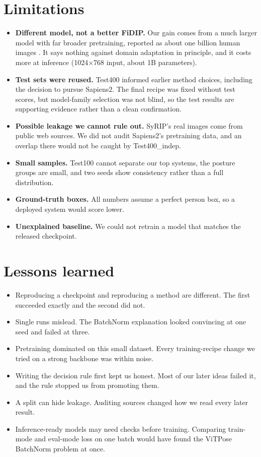 \documentclass[11pt]{article}
\begin{document}
\section{Limitations}
\begin{itemize}
  \item \textbf{Different model, not a better FiDIP.} Our gain comes from a much larger model with far broader pretraining, reported as about one billion human images \cite{sapiens2docs}. It says nothing against domain adaptation in principle, and it costs more at inference (1024$\times$768 input, about 1B parameters).
  \item \textbf{Test sets were reused.} Test400 informed earlier method choices, including the decision to pursue Sapiens2. The final recipe was fixed without test scores, but model-family selection was not blind, so the test results are supporting evidence rather than a clean confirmation.
  \item \textbf{Possible leakage we cannot rule out.} SyRIP's real images come from public web sources. We did not audit Sapiens2's pretraining data, and an overlap there would not be caught by Test400\_indep.
  \item \textbf{Small samples.} Test100 cannot separate our top systems, the posture groups are small, and two seeds show consistency rather than a full distribution.
  \item \textbf{Ground-truth boxes.} All numbers assume a perfect person box, so a deployed system would score lower.
  \item \textbf{Unexplained baseline.} We could not retrain a model that matches the released checkpoint.
\end{itemize}

\section{Lessons learned}
\begin{itemize}
  \item Reproducing a checkpoint and reproducing a method are different. The first succeeded exactly and the second did not.
  \item Single runs mislead. The BatchNorm explanation looked convincing at one seed and failed at three.
  \item Pretraining dominated on this small dataset. Every training-recipe change we tried on a strong backbone was within noise.
  \item Writing the decision rule first kept us honest. Most of our later ideas failed it, and the rule stopped us from promoting them.
  \item A split can hide leakage. Auditing sources changed how we read every later result.
  \item Inference-ready models may need checks before training. Comparing train-mode and eval-mode loss on one batch would have found the ViTPose BatchNorm problem at once.
\end{itemize}
\end{document}
